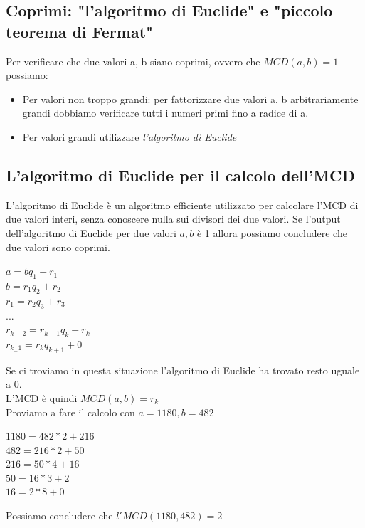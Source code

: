 \documentclass[11pt, oneside]{article}   	%
\begin{document}
\subsection*{Coprimi: "l'algoritmo di Euclide" e "piccolo teorema di Fermat"}
Per verificare che due valori a, b siano coprimi, ovvero che $MCD(a, b)=1$ possiamo:
\begin{itemize}
\item Per valori non troppo grandi: per fattorizzare due valori a, b arbitrariamente grandi dobbiamo verificare tutti i numeri primi fino a radice di a. 
\item Per valori grandi utilizzare \emph{l'algoritmo di Euclide}
\end{itemize}
\subsection*{L'algoritmo di Euclide per il calcolo dell'MCD}
L'algoritmo di Euclide è un algoritmo efficiente utilizzato per calcolare l'MCD di due valori interi, senza conoscere nulla sui divisori dei due valori. Se l'output dell'algoritmo di Euclide per due valori $a,b$ è 1 allora possiamo concludere che due valori sono coprimi.
\begin{center}
$a = bq_1 + r_1$\\
$b = r_1 q_2 + r_2$\\
$r_1 = r_2q_3 + r_3$\\
...\\
$r_{k-2} = r_{k-1}q_k+r_k$\\
$r_{k_-1} = r_kq_{k+1} + 0$\\
\end{center}
Se ci troviamo in questa situazione l'algoritmo di Euclide ha trovato resto uguale a 0.\\
L'MCD è quindi $MCD(a,b) = r_k$\\
Proviamo a fare il calcolo con $a = 1180, b= 482$
\begin{center}
$1180 = 482*  2 +216$\\
$482 = 216*2+50$\\
$216 =50*4+16$\\
$50=16*3+2$\\
$16=2*8+0$
\end{center}
Possiamo concludere che $l'MCD(1180, 482) = 2$
\end{document}
